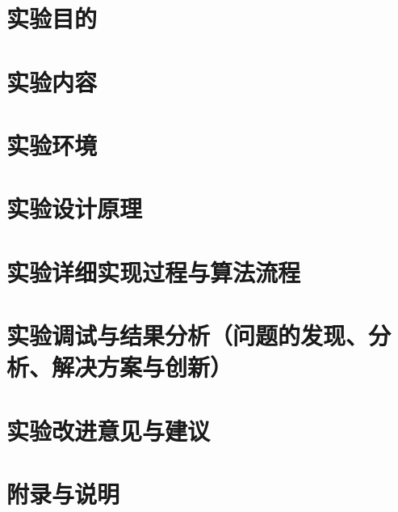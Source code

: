 \documentclass{article}
\begin{document}
\section{实验目的}
\section{实验内容}
\section{实验环境}
\section{实验设计原理}
\section{实验详细实现过程与算法流程}
\section{实验调试与结果分析（问题的发现、分析、解决方案与创新）}
\section{实验改进意见与建议}
\section{附录与说明}
\end{document}
